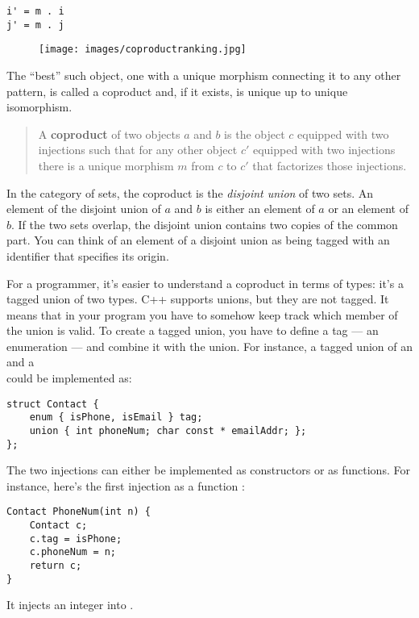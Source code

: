\begin{Verbatim}
i' = m . i
j' = m . j
\end{Verbatim}

\begin{figure}[H]
\centering
\texttt{[image: images/coproductranking.jpg]}
\end{figure}

\noindent
The ``best'' such object, one with a unique morphism connecting it to
any other pattern, is called a coproduct and, if it exists, is unique up
to unique isomorphism.

\begin{quote}
A \textbf{coproduct} of two objects $a$ and $b$ is the object
$c$ equipped with two injections such that for any other object
$c'$ equipped with two injections there is a unique morphism
$m$ from $c$ to $c'$ that factorizes those injections.
\end{quote}

\noindent
In the category of sets, the coproduct is the \emph{disjoint union} of
two sets. An element of the disjoint union of $a$ and $b$ is
either an element of $a$ or an element of $b$. If the two sets
overlap, the disjoint union contains two copies of the common part. You
can think of an element of a disjoint union as being tagged with an
identifier that specifies its origin.

For a programmer, it's easier to understand a coproduct in terms of
types: it's a tagged union of two types. C++ supports unions, but they
are not tagged. It means that in your program you have to somehow keep
track which member of the union is valid. To create a tagged union, you
have to define a tag --- an enumeration --- and combine it with the
union. For instance, a tagged union of an  and a\\
 could be implemented as:

\begin{Verbatim}
struct Contact { 
    enum { isPhone, isEmail } tag;
    union { int phoneNum; char const * emailAddr; };
};
\end{Verbatim}
The two injections can either be implemented as constructors or as
functions. For instance, here's the first injection as a function
:

\begin{Verbatim}
Contact PhoneNum(int n) { 
    Contact c;
    c.tag = isPhone;
    c.phoneNum = n;
    return c;
}
\end{Verbatim}
It injects an integer into .

